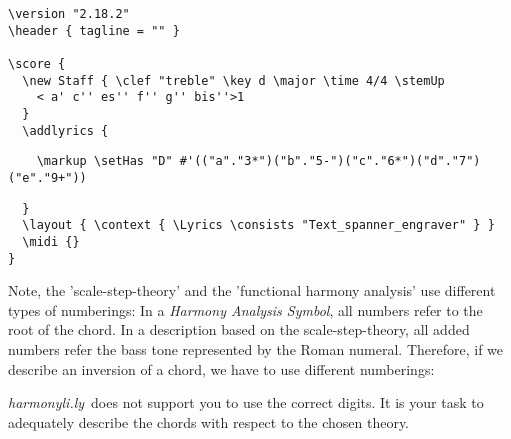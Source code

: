 \documentclass[
  DIV=calc,
  BCOR=5mm,
  12pt,
  headings=small,
  oneside,
  abstract=true,
  toc=bib,
  xcolor=dvipsnames,
  openany,
  ngerman,english]{scrartcl}
\newcommand{\hlyn}[0]{\textit{harmonyli.ly}}
\newcommand{\has}[1]{\textit{Harmony Analysis Symbol#1}}
\begin{document}
\begin{center}
\end{center}

\begin{scriptsize}
\begin{verbatim}
\version "2.18.2"
\header { tagline = "" }

\score {
  \new Staff { \clef "treble" \key d \major \time 4/4 \stemUp 
    < a' c'' es'' f'' g'' bis''>1 
  }
  \addlyrics {
  \end{verbatim}
  { \color{red} \verb|    \markup \setHas "D" #'(("a"."3*")("b"."5-")("c"."6*")("d"."7")("e"."9+")) |
  }
\begin{verbatim}    
  }
  \layout { \context { \Lyrics \consists "Text_spanner_engraver" } }
  \midi {}
}
\end{verbatim}
\end{scriptsize}

Note, the 'scale-step-theory' and the 'functional harmony analysis' use
different types of numberings: In a \has{}, all numbers refer to the root of the
chord. In a description based on the scale-step-theory, all added numbers refer
the bass tone represented by the Roman numeral. Therefore, if we describe an
inversion of a chord, we have to use different numberings:

\begin{center}
\end{center}

\hlyn\ does not support you to use the correct digits. It is your task
to adequately describe the chords with respect to the chosen theory.
\end{document}
